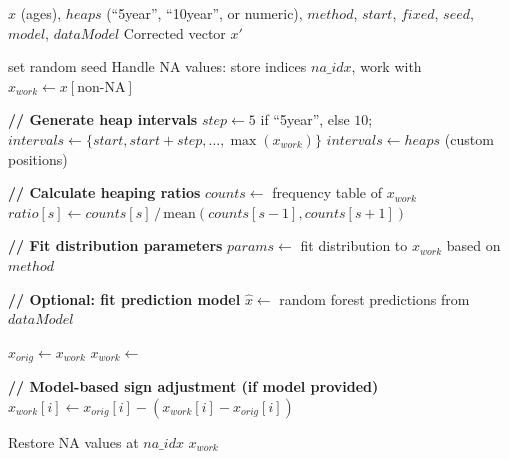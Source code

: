 \documentclass[12pt]{article}
\theoremstyle{plain}
\theoremstyle{definition}
\begin{document}
\begin{algorithm}
\small
\caption{Correct Heaping (Main Procedure)}\label{alg:correctHeaps}
\begin{algorithmic}[1]
\Require $x$ (ages), $heaps$ (``5year'', ``10year'', or numeric), $method$, $start$, $fixed$, $seed$, $model$, $dataModel$
\Ensure Corrected vector $x'$

 set random seed \EndIf
\State Handle NA values: store indices $na\_idx$, work with $x_{work} \gets x[\text{non-NA}]$

\State \textbf{// Generate heap intervals}
    \State $step \gets 5$ if ``5year'', else $10$; \quad $intervals \gets \{start, start{+}step, \ldots, \max(x_{work})\}$
\Else
    \State $intervals \gets heaps$ (custom positions)
\EndIf

\State \textbf{// Calculate heaping ratios}
\State $counts \gets$ frequency table of $x_{work}$
    \State $ratio[s] \gets counts[s] \,/\, \text{mean}(counts[s{-}1], counts[s{+}1])$
\EndFor

\State \textbf{// Fit distribution parameters}
\State $params \gets$ fit distribution to $x_{work}$ based on $method$

\State \textbf{// Optional: fit prediction model}
    \State $\hat{x} \gets$ random forest predictions from $dataModel$
\EndIf

\State $x_{orig} \gets x_{work}$
    \State $x_{work} \gets$ 
\EndFor

\State \textbf{// Model-based sign adjustment (if model provided)}
        \State $x_{work}[i] \gets x_{orig}[i] - (x_{work}[i] - x_{orig}[i])$ 
    \EndIf
\EndFor

\State Restore NA values at $na\_idx$
\State \Return $x_{work}$
\end{algorithmic}
\end{algorithm}
\end{document}
